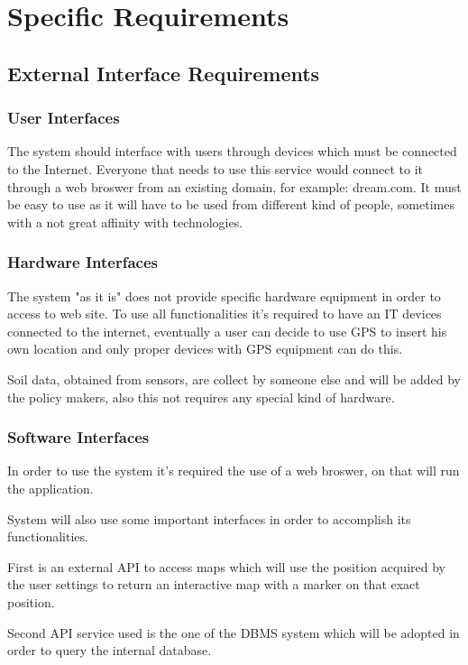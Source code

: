 \documentclass[table, 12pt]{article}
\begin{document}
\section{Specific Requirements}

\subsection{External Interface Requirements}

\subsubsection{User Interfaces}
The system should interface with users through devices which must be connected to the Internet.
Everyone that needs to use this service would connect to it through a web broswer from an existing domain, for example: dream.com.
It must be easy to use as it will have to be used from different kind of people, sometimes with a not great affinity with technologies.

\subsubsection{Hardware Interfaces}
The system "as it is" does not provide specific hardware equipment in order to access to web site. To use all functionalities it's required to have an IT devices connected to the internet, eventually a user can decide to use GPS to insert his own location and only proper devices with GPS equipment can do this. 

Soil data, obtained from sensors, are collect by someone else and will be added by the policy makers, also this not requires any special kind of hardware.

\subsubsection{Software Interfaces}
\label{software_interfaces}
In order to use the system it's required the use of a web broswer, on that will run the application.

System will also use some important interfaces in order to accomplish its functionalities.

First is an external API to access maps which will use the position acquired by the user settings to return an interactive map with a marker on that exact position.

Second API service used is the one of the DBMS system which will be adopted in order to query the internal database.
\end{document}
